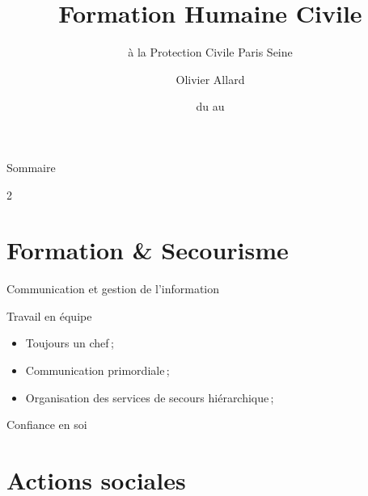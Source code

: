 \documentclass[
  11pt,
  aspectratio=169
]{beamer}
\title{Formation Humaine Civile}
\subtitle{à la Protection Civile Paris Seine}
\author{Olivier Allard}
\institute{École polytechnique}
\date{du \oldstylenums{26/10/2025} au \oldstylenums{04/04/2026}}
\begin{document}

\begin{frame}
  \titlepage
\end{frame}



\begin{frame}{Sommaire}
  \begin{multicols}{2}
    \tableofcontents
  \end{multicols}
\end{frame}



\section{Formation \& Secourisme}

\begin{frame}{Communication et gestion de l’information}
  
\end{frame}

\begin{frame}{Travail en équipe}
  \begin{itemize}
    \item Toujours un chef ;
    \item Communication primordiale ;
    \item Organisation des services de secours hiérarchique ;
  \end{itemize}
\end{frame}

\begin{frame}{Confiance en soi}
  
\end{frame}

\section{Actions sociales}

\begin{frame}
  
\end{frame}
\end{document}
